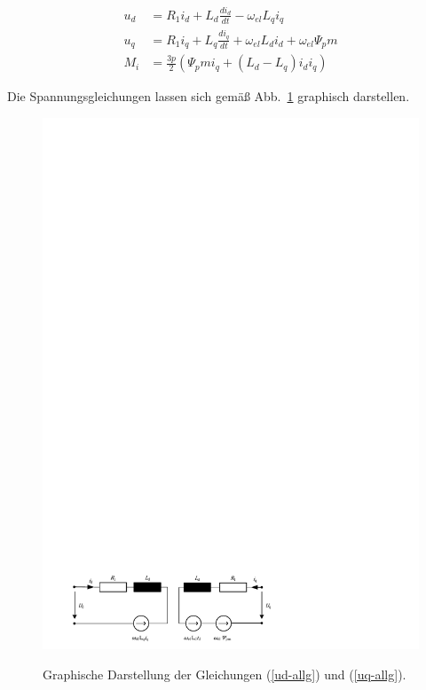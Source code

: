 \documentclass[conference,twocolumn]{IEEEtran}
\begin{document}
\begin{align}
u_d &= R_1 i_d + L_d \frac{di_d}{dt} - \omega_{el}L_q i_q  \label{uq-allg} \\ 
u_q &= R_1 i_q + L_q \frac{di_q}{dt} + \omega_{el}L_d i_d + \omega_{el}\Psi_pm \label{ud-allg} \\ 
M_i &= \frac{3p}{2}(\Psi_pm i_q + (L_d - L_q)i_d i_q)
\end{align}

Die Spannungsgleichungen lassen sich gemäß Abb.~\ref{fig:spannungsgleichungen} graphisch darstellen.

\begin{figure}
\includegraphics[width=1.25\columnwidth]{img/spannungsgleichungen}
\label{fig:spannungsgleichungen}
\caption{Graphische Darstellung der Gleichungen (\ref{ud-allg}) und (\ref{uq-allg}).}
\end{figure}
\end{document}
